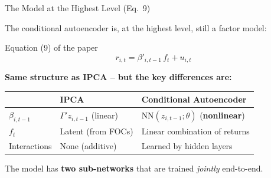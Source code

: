 \documentclass[aspectratio=169]{beamer}
\begin{document}
\begin{frame}{The Model at the Highest Level (Eq.\ 9)}

The conditional autoencoder is, at the highest level, still a factor model:

\begin{block}{Equation (9) of the paper}
\vspace{-0.5em}
\[
\boxed{r_{i,t} = \beta'_{i,t-1}\, f_t + u_{i,t}}
\]
\end{block}

\vspace{0.3em}
\textbf{Same structure as IPCA -- but the key differences are:}

\vspace{0.3em}
\begin{center}
\renewcommand{\arraystretch}{1.4}
\begin{tabular}{lll}
\toprule
& \textbf{IPCA} & \textbf{Conditional Autoencoder} \\
\midrule
$\beta_{i,t-1}$ & $\Gamma' z_{i,t-1}$ (linear) & $\text{NN}(z_{i,t-1}; \theta)$ (\textbf{nonlinear}) \\
$f_t$ & Latent (from FOCs) & Linear combination of returns \\
Interactions & None (additive) & Learned by hidden layers \\
\bottomrule
\end{tabular}
\end{center}

\vspace{0.5em}
The model has \textbf{two sub-networks} that are trained \emph{jointly} end-to-end.
\end{frame}
%
%
\end{document}
